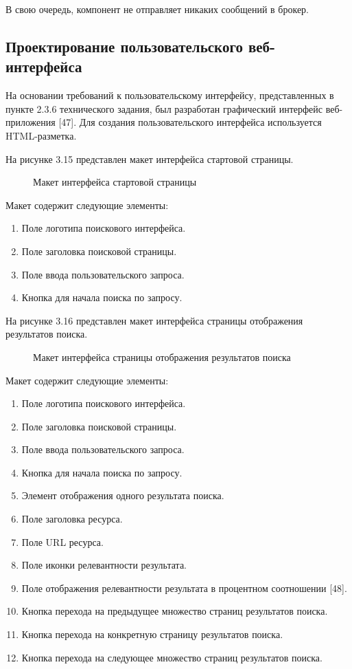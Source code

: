 В свою очередь, компонент не отправляет никаких сообщений в брокер.

\subsection{Проектирование пользовательского веб-интерфейса}

На основании требований к пользовательскому интерфейсу, представленных в пункте 2.3.6 технического задания, был разработан графический интерфейс веб-приложения [47]. Для создания пользовательского интерфейса используется HTML-разметка.

На рисунке 3.15 представлен макет интерфейса стартовой страницы.
\begin{figure}[H]
\caption{Макет интерфейса стартовой страницы}
\label{web/main.png:image}
\end{figure}
Макет содержит следующие элементы:
\begin{enumerate}
\item Поле логотипа поискового интерфейса.
\item Поле заголовка поисковой страницы.
\item Поле ввода пользовательского запроса.
\item Кнопка для начала поиска по запросу.
\end{enumerate}

На рисунке 3.16 представлен макет интерфейса страницы отображения результатов поиска.
\begin{figure}[H]
\caption{Макет интерфейса страницы отображения результатов поиска}
\label{web/results.png:image}
\end{figure}
Макет содержит следующие элементы:
\begin{enumerate}
\item Поле логотипа поискового интерфейса.
\item Поле заголовка поисковой страницы.
\item Поле ввода пользовательского запроса.
\item Кнопка для начала поиска по запросу.
\item Элемент отображения одного результата поиска.
\item Поле заголовка ресурса.
\item Поле URL ресурса.
\item Поле иконки релевантности результата.
\item Поле отображения релевантности результата в процентном соотношении [48].
\item Кнопка перехода на предыдущее множество страниц результатов поиска.
\item Кнопка перехода на конкретную страницу результатов поиска.
\item Кнопка перехода на следующее множество страниц результатов поиска.
\end{enumerate}